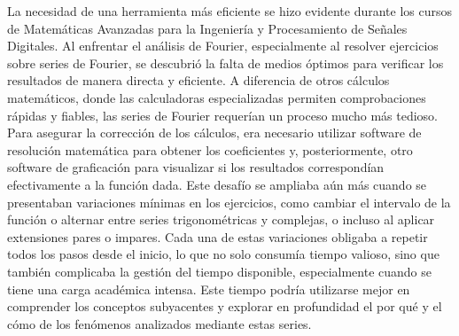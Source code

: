 La necesidad de una herramienta más eficiente se hizo evidente durante los cursos de Matemáticas Avanzadas para la Ingeniería y Procesamiento de Señales Digitales. Al enfrentar el análisis de Fourier, especialmente al resolver ejercicios sobre series de Fourier, se descubrió la falta de medios óptimos para verificar los resultados de manera directa y eficiente. A diferencia de otros cálculos matemáticos, donde las calculadoras especializadas permiten comprobaciones rápidas y fiables, las series de Fourier requerían un proceso mucho más tedioso. Para asegurar la corrección de los cálculos, era necesario utilizar software de resolución matemática para obtener los coeficientes y, posteriormente, otro software de graficación para visualizar si los resultados correspondían efectivamente a la función dada. Este desafío se ampliaba aún más cuando se presentaban variaciones mínimas en los ejercicios, como cambiar el intervalo de la función o alternar entre series trigonométricas y complejas, o incluso al aplicar extensiones pares o impares. Cada una de estas variaciones obligaba a repetir todos los pasos desde el inicio, lo que no solo consumía tiempo valioso, sino que también complicaba la gestión del tiempo disponible, especialmente cuando se tiene una carga académica intensa. Este tiempo podría utilizarse mejor en comprender los conceptos subyacentes y explorar en profundidad el por qué y el cómo de los fenómenos analizados mediante estas series.

